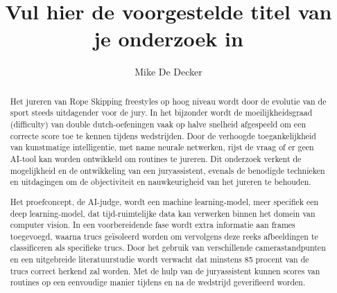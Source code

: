 \documentclass[english]{hogent-article}
\title{Vul hier de voorgestelde titel van je onderzoek in}
\author{Mike De Decker}
\begin{document}
\begin{abstract}
Het jureren van Rope Skipping freestyles op hoog niveau wordt door de evolutie van de sport steeds uitdagender voor de jury. In het bijzonder wordt de moeilijkheidsgraad (difficulty) van double dutch-oefeningen vaak op halve snelheid afgespeeld om een correcte score toe te kennen tijdens wedstrijden. Door de verhoogde toegankelijkheid van kunstmatige intelligentie, met name neurale netwerken, rijst de vraag of er geen AI-tool kan worden ontwikkeld om routines te jureren. Dit onderzoek verkent de mogelijkheid en de ontwikkeling van een juryassistent, evenals de benodigde technieken en uitdagingen om de objectiviteit en nauwkeurigheid van het jureren te behouden.

Het proefconcept, de AI-judge, wordt een machine learning-model, meer specifiek een deep learning-model, dat tijd-ruimtelijke data kan verwerken binnen het domein van computer vision. In een voorbereidende fase wordt extra informatie aan frames toegevoegd, waarna trucs geïsoleerd worden om vervolgens deze reeks afbeeldingen te classificeren als specifieke trucs. Door het gebruik van verschillende camerastandpunten en een uitgebreide literatuurstudie wordt verwacht dat minstens 85 procent van de trucs correct herkend zal worden. Met de hulp van de juryassistent kunnen scores van routines op een eenvoudige manier tijdens en na de wedstrijd geverifieerd worden.
\end{abstract}

\tableofcontents



\printbibliography[heading=bibintoc]
\end{document}
